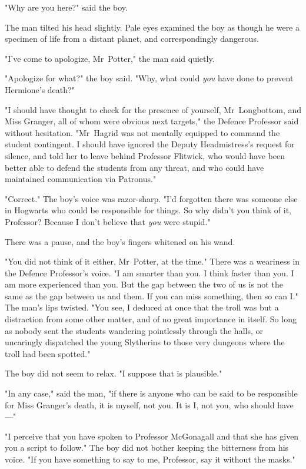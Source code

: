 "Why are you here?" said the boy.

The man tilted his head slightly. Pale eyes examined the boy as though he were
a specimen of life from a distant planet, and correspondingly dangerous.

"I've come to apologize, Mr~Potter," the man said quietly.

"Apologize for what?" the boy said. "Why, what could \emph{you} have done to
prevent Hermione's death?"

"I should have thought to check for the presence of yourself, Mr~Longbottom,
and Miss Granger, all of whom were obvious next targets," the Defence Professor
said without hesitation. "Mr~Hagrid was not mentally equipped to command the
student contingent. I should have ignored the Deputy Headmistress's request for
silence, and told her to leave behind Professor Flitwick, who would have been
better able to defend the students from any threat, and who could have
maintained communication via Patronus."

"Correct." The boy's voice was razor-sharp. "I'd forgotten there was someone
else in Hogwarts who could be responsible for things. So why didn't you think
of it, Professor? Because I don't believe that \emph{you} were stupid."

There was a pause, and the boy's fingers whitened on his wand.

"You did not think of it either, Mr~Potter, at the time." There was a
weariness in the Defence Professor's voice. "I am smarter than you. I think
faster than you. I am more experienced than you. But the gap between the two of
us is not the same as the gap between us and them. If you can miss something,
then so can I." The man's lips twisted. "You see, I deduced at once that the
troll was but a distraction from some other matter, and of no great importance
in itself. So long as nobody sent the students wandering pointlessly through
the halls, or uncaringly dispatched the young Slytherins to those very dungeons
where the troll had been spotted."

The boy did not seem to relax. "I suppose that is plausible."

"In any case," said the man, "if there is anyone who can be said to be
responsible for Miss Granger's death, it is myself, not you. It is I, not you,
who should have---"

"I perceive that you have spoken to Professor McGonagall and that she has given
you a script to follow." The boy did not bother keeping the bitterness from his
voice. "If you have something to say to me, Professor, say it without the
masks."

